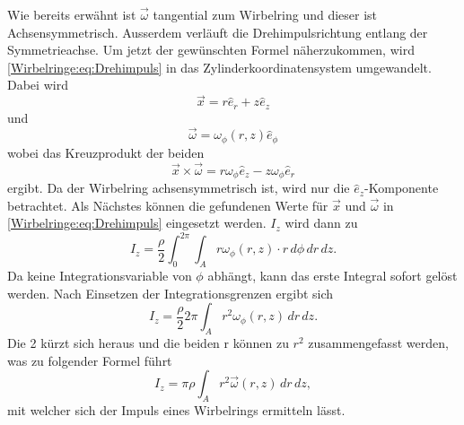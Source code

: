 Wie bereits erwähnt ist \(\vec{\omega}\) tangential zum Wirbelring und dieser ist Achsensymmetrisch.
Ausserdem verläuft die Drehimpulsrichtung entlang der Symmetrieachse.
Um jetzt der gewünschten Formel näherzukommen, wird \eqref{Wirbelringe:eq:Drehimpuls} in das Zylinderkoordinatensystem umgewandelt.
Dabei wird
\begin{equation*}
    \vec{x}
    =
    r\hat{e}_r + z\hat{e}_z
\end{equation*}
und
\begin{equation*}
    \vec{\omega}
    =
    \omega_\phi(r,z)\hat{e}_\phi
\end{equation*}
wobei das Kreuzprodukt der beiden 
\begin{equation*}
    \vec{x}\times\vec{\omega}
    =
    r\omega_\phi\hat{e}_z - z\omega_\phi\hat{e}_r
\end{equation*}
ergibt. Da der Wirbelring achsensymmetrisch ist, wird nur die \(\hat{e}_z\)-Komponente betrachtet.
Als Nächstes können die gefundenen Werte für \(\vec{x}\) und \(\vec{\omega}\) in \eqref{Wirbelringe:eq:Drehimpuls} eingesetzt werden.
\(I_z\) wird dann zu
\begin{equation*}
    I_z
    =
    \frac{\rho}{2}\int_{0}^{2\pi}\int_{A}r\omega_\phi(r,z)\cdot r\,d\phi \,dr\,dz.
\end{equation*}
Da keine Integrationsvariable von \(\phi\) abhängt, kann das erste Integral sofort gelöst werden. Nach Einsetzen der Integrationsgrenzen ergibt sich
\begin{equation*}
    I_z
    =
    \frac{\rho}{2}2\pi\int_{A}r^2\omega_\phi(r,z)\,dr\,dz.
\end{equation*}
Die 2 kürzt sich heraus und die beiden r können zu \(r^2\) zusammengefasst werden, was zu folgender Formel führt
\begin{equation}
    I_z
    =
    \pi\rho\int_{A}r^2\vec{\omega}(r,z)\,dr\,dz
    \label{Wirbelringe:eq:achssymImp},
\end{equation}
mit welcher sich der Impuls eines Wirbelrings ermitteln lässt.

